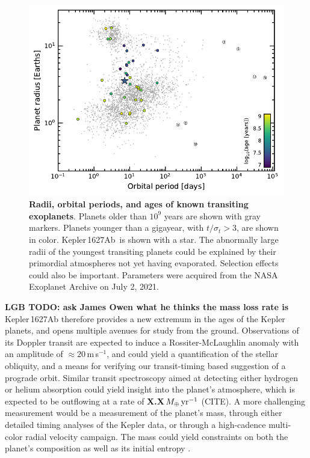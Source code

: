 \documentclass[12pt,modern,twocolumn,tighten]{aastex63}
\newcommand{\pn}{Kepler\,1627Ab} %
\newcommand{\ms}{\,m\,s$^{-1}$}
\begin{document}
\begin{figure}[tp]
	\begin{center}
		\leavevmode
		\includegraphics[width=\textwidth]{f14.pdf}
	\end{center}
	\vspace{-0.7cm}
	\caption{
    {\bf Radii, orbital periods, and ages of known transiting
    exoplanets}.  Planets older than
    $10^9$ years are shown with gray markers.  Planets younger than a
    gigayear, with $t/\sigma_t > 3$, are shown in color.  
    \pn\ is shown with a star.
    The abnormally large radii of the youngest transiting planets
    could be explained by their primordial atmospheres not yet
    having evaporated.
    Selection effects could also be important.
    Parameters were acquired from the NASA Exoplanet Archive on July
    2, 2021.
		\label{fig:rp_period_age}
	}
\end{figure}


{\bf LGB TODO: ask James Owen what he thinks the mass loss rate is}
Kepler\,1627Ab therefore provides a new extremum in the ages of the
Kepler planets, and opens multiple avenues for study from the ground.
Observations of its Doppler transit are expected to induce a
Rossiter-McLaughlin anomaly with an amplitude of $\approx 20$\ms, and
could yield a quantification of the stellar obliquity, and a means for
verifying our transit-timing based suggestion of a prograde orbit.
Similar transit spectroscopy aimed at detecting either hydrogen or
helium absorption could yield insight into the planet's atmosphere,
which is expected to be outflowing at a rate of {\bf
X.X}\,$M_\oplus\,{\rm yr}^{-1}$ (CITE).  A more challenging
measurement would be a measurement of the planet's mass, through
either detailed timing analyses of the Kepler data, or through a
high-cadence multi-color radial velocity campaign.  The mass could
yield constraints on both the planet's composition as well as its
initial entropy \citep{owen_constraining_2020}.
\end{document}
